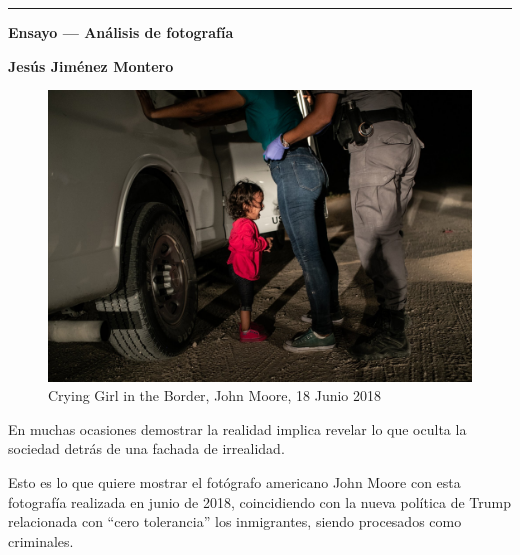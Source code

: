 \documentclass[11pt]{article}
\begin{document}
\begin{titlepage}

	\centering
	\hrule
	\vspace{1cm}
	{\bfseries\Huge Ensayo --- Análisis de fotografía \par}
	\vspace{0.5cm}
	\large{\textbf{Jesús Jiménez Montero} \par}

	\vspace{1cm}

	\begin{figure}[H]

		\includegraphics[width=\textwidth,height=\textheight,keepaspectratio]{Images/WPPF-2019PhotoContest-POYNominee-JohnMoore.jpg}
		\caption{{Crying Girl in the Border, John Moore, 18 Junio 2018}}
		\label{fig:foto}

	\end{figure}

	\vspace{0.5cm}


	\vspace{1cm}
	\hrulefill
\end{titlepage}
\newpage


En muchas ocasiones demostrar la realidad implica revelar lo que oculta la sociedad detrás de una fachada de irrealidad.

Esto es lo que quiere mostrar el fotógrafo americano John Moore con esta fotografía realizada en junio de 2018, coincidiendo con la nueva política de Trump relacionada con “cero tolerancia” los inmigrantes, siendo procesados como criminales.
\end{document}
